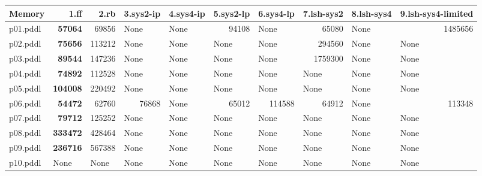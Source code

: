 \documentclass{article}
\begin{document}
\begin{tabular}{@{}lrrrrrrrrr@{}}
Memory & 1.ff & 2.rb & 3.sys2-ip & 4.sys4-ip & 5.sys2-lp & 6.sys4-lp & 7.lsh-sys2 & 8.lsh-sys4 & 9.lsh-sys4-limited \\
\midrule
p01.pddl & \textbf{57064} & 69856 & \multicolumn{1}{|l|}{None} & \multicolumn{1}{|l|}{None} & 94108 & \multicolumn{1}{|l|}{None} & 65080 & \multicolumn{1}{|l|}{None} & 1485656 \\
p02.pddl & \textbf{75656} & 113212 & \multicolumn{1}{|l|}{None} & \multicolumn{1}{|l|}{None} & \multicolumn{1}{|l|}{None} & \multicolumn{1}{|l|}{None} & 294560 & \multicolumn{1}{|l|}{None} & \multicolumn{1}{|l|}{None} \\
p03.pddl & \textbf{89544} & 147236 & \multicolumn{1}{|l|}{None} & \multicolumn{1}{|l|}{None} & \multicolumn{1}{|l|}{None} & \multicolumn{1}{|l|}{None} & 1759300 & \multicolumn{1}{|l|}{None} & \multicolumn{1}{|l|}{None} \\
p04.pddl & \textbf{74892} & 112528 & \multicolumn{1}{|l|}{None} & \multicolumn{1}{|l|}{None} & \multicolumn{1}{|l|}{None} & \multicolumn{1}{|l|}{None} & \multicolumn{1}{|l|}{None} & \multicolumn{1}{|l|}{None} & \multicolumn{1}{|l|}{None} \\
p05.pddl & \textbf{104008} & 220492 & \multicolumn{1}{|l|}{None} & \multicolumn{1}{|l|}{None} & \multicolumn{1}{|l|}{None} & \multicolumn{1}{|l|}{None} & \multicolumn{1}{|l|}{None} & \multicolumn{1}{|l|}{None} & \multicolumn{1}{|l|}{None} \\
p06.pddl & \textbf{54472} & 62760 & 76868 & \multicolumn{1}{|l|}{None} & 65012 & 114588 & 64912 & \multicolumn{1}{|l|}{None} & 113348 \\
p07.pddl & \textbf{79712} & 125252 & \multicolumn{1}{|l|}{None} & \multicolumn{1}{|l|}{None} & \multicolumn{1}{|l|}{None} & \multicolumn{1}{|l|}{None} & \multicolumn{1}{|l|}{None} & \multicolumn{1}{|l|}{None} & \multicolumn{1}{|l|}{None} \\
p08.pddl & \textbf{333472} & 428464 & \multicolumn{1}{|l|}{None} & \multicolumn{1}{|l|}{None} & \multicolumn{1}{|l|}{None} & \multicolumn{1}{|l|}{None} & \multicolumn{1}{|l|}{None} & \multicolumn{1}{|l|}{None} & \multicolumn{1}{|l|}{None} \\
p09.pddl & \textbf{236716} & 567388 & \multicolumn{1}{|l|}{None} & \multicolumn{1}{|l|}{None} & \multicolumn{1}{|l|}{None} & \multicolumn{1}{|l|}{None} & \multicolumn{1}{|l|}{None} & \multicolumn{1}{|l|}{None} & \multicolumn{1}{|l|}{None} \\
p10.pddl & \multicolumn{1}{|l|}{None} & \multicolumn{1}{|l|}{None} & \multicolumn{1}{|l|}{None} & \multicolumn{1}{|l|}{None} & \multicolumn{1}{|l|}{None} & \multicolumn{1}{|l|}{None} & \multicolumn{1}{|l|}{None} & \multicolumn{1}{|l|}{None} & \multicolumn{1}{|l|}{None} \\

\end{tabular}
\end{document}
